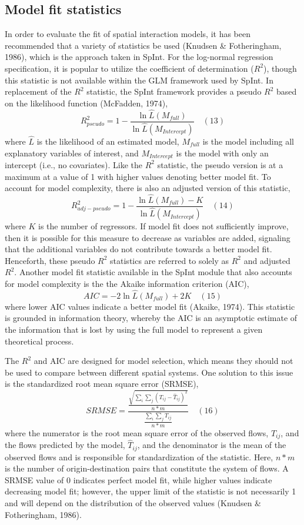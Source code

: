 \documentclass[11pt]{article}
\begin{document}
    \subsection{Model fit statistics}\label{model-fit-statistics}

    In order to evaluate the fit of spatial interaction models, it has been
recommended that a variety of statistics be used (Knudsen \&
Fotheringham, 1986), which is the approach taken in SpInt. For the
log-normal regression specification, it is popular to utilize the
coefficient of determination (\(R^2\)), though this statistic is not
available within the GLM framework used by SpInt. In replacement of the
\(R^2\) statistic, the SpInt framework provides a pseudo \(R^2\) based
on the likelihood function (McFadden, 1974),
%
\[R^2_{pseudo} = 1 - \frac{\ln \hat{L}(M_{full})}{\ln \hat{L}(M_{Intercept})} \quad(13)\]
%
where \(\hat{L}\) is the likelihood of an estimated model, \(M_{full}\)
is the model including all explanatory variables of interest, and
\(M_{Intercept}\) is the model with only an intercept (i.e., no
covariates). Like the \(R^2\) statistic, the pseudo version is at a
maximum at a value of 1 with higher values denoting better model fit. To
account for model complexity, there is also an adjusted version of this
statistic,
%
\[R^2_{adj-pseudo} = 1 - \frac{\ln \hat{L}(M_{full}) - K}{\ln \hat{L}(M_{Intercept})} \quad(14)\]
%
where \(K\) is the number of regressors. If model fit does not
sufficiently improve, then it is possible for this measure to decrease
as variables are added, signaling that the additional variables do not
contribute towards a better model fit. Henceforth, these pseudo \(R^2\)
statistics are referred to solely as \(R^2\) and adjusted \(R^2\).
Another model fit statistic available in the SpInt module that also
accounts for model complexity is the the Akaike information criterion
(AIC),
%
\[ AIC = -2\ln \hat{L}(M_{full}) + 2K  \quad(15)\]
%
where lower AIC values indicate a better model fit (Akaike, 1974). This
statistic is grounded in information theory, whereby the AIC is an
asymptotic estimate of the information that is lost by using the full
model to represent a given theoretical process.

The \(R^2\) and AIC are designed for model selection, which means
they should not be used to compare between different spatial systems.
One solution to this issue is the standardized root mean square error
(SRMSE),
%
\[ SRMSE = \frac{\frac{\sqrt{\sum_{i}\sum_{j}(T_{ij} - \hat{T}_{ij})^{2}}}{n*m}}{\frac{\sum_{i}\sum_{j}T_{ij}}{n*m}} \quad(16)\]
%
where the numerator is the root mean square error of the observed
flows, \(T_{ij}\), and the flows predicted by the model,
\(\hat{T}_{ij}\), and the denominator is the mean of the observed flows
and is responsible for standardization of the statistic. Here, \(n*m\)
is the number of origin-destination pairs that constitute the system of
flows. A SRMSE value of 0 indicates perfect model fit, while higher
values indicate decreasing model fit; however, the upper limit of the
statistic is not necessarily 1 and will depend on the distribution of
the observed values (Knudsen \& Fotheringham, 1986).
\end{document}
